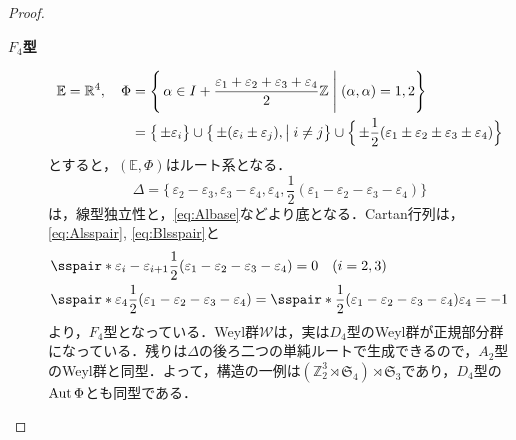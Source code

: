 \documentclass[rep_main]{subfiles}
\begin{document}
\begin{proof}
\begin{description}
		\item[\textbf{$F_4$型}] 
		\begin{align}
			\mathbb{E} = \mathbb{R}^4,\quad  \Phi &= \Biggl\{\, \alpha \in I + \frac{\varepsilon_1 + \varepsilon_2 + \varepsilon_3 + \varepsilon_4}{2}\mathbb{Z} \Biggm| (\alpha, \alpha) = 1, 2\Biggr\} \\
			&= \bigl\{\, \pm\varepsilon_i\bigr\} \cup \bigl\{\, \pm(\varepsilon_i \pm \varepsilon_j), \bigm| i \neq j\bigr\} \cup \Bigl\{\, \pm\frac{1}{2}(\varepsilon_1 \pm \varepsilon_2 \pm \varepsilon_3 \pm \varepsilon_4)\Bigr\}
		\end{align}
		とすると，$(\mathbb{E}, \Phi)$はルート系となる．
		\begin{equation}
			\Delta = \Biggl\{\, \varepsilon_2 - \varepsilon_3, \varepsilon_3 - \varepsilon_4, \varepsilon_4, \frac{1}{2}(\varepsilon_1 - \varepsilon_2 - \varepsilon_3 - \varepsilon_4)\Biggr\}
		\end{equation}	
		は，線型独立性と，\eqref{eq:Albase}などより底となる．Cartan行列は，\eqref{eq:Alsspair}, \eqref{eq:Blsspair}と
		\begin{align}
			&\sspair*{\varepsilon_i - \varepsilon_{i+1}}{\frac{1}{2}(\varepsilon_1 - \varepsilon_2 - \varepsilon_3 - \varepsilon_4)} = 0\quad  (i = 2, 3)\\
			&\sspair*{\varepsilon_4}{\frac{1}{2}(\varepsilon_1 - \varepsilon_2 - \varepsilon_3 - \varepsilon_4)} = \sspair*{\frac{1}{2}(\varepsilon_1 - \varepsilon_2 - \varepsilon_3 - \varepsilon_4)}{\varepsilon_4} = -1
		\end{align}
		より，$F_4$型となっている．Weyl群$\mathscr{W}$は，実は$D_4$型のWeyl群が正規部分群になっている．残りは$\Delta$の後ろ二つの単純ルートで生成できるので，$A_2$型のWeyl群と同型．よって，構造の一例は$(\mathbb{Z}_2^3 \rtimes \mathfrak{S}_4) \rtimes \mathfrak{S}_3$であり，$D_4$型の$\operatorname{Aut}\Phi$とも同型である．
		

\end{description}
\end{proof}
\end{document}
